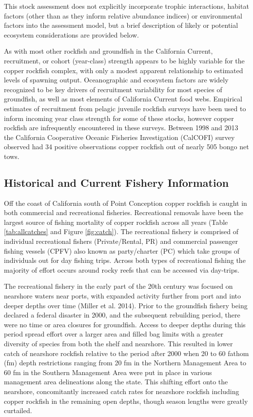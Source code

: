 \documentclass[11pt,
  english,
  letterpaper,
]{article}
\begin{document}
This stock assessment does not explicitly incorporate trophic interactions, habitat factors (other than as they inform relative abundance indices) or environmental factors into the assessment model, but a brief description of likely or potential ecosystem considerations are provided below.

As with most other rockfish and groundfish in the California Current, recruitment, or cohort (year-class) strength appears to be highly variable for the copper rockfish complex, with only a modest apparent relationship to estimated levels of spawning output. Oceanographic and ecosystem factors are widely recognized to be key drivers of recruitment variability for most species of groundfish, as well as most elements of California Current food webs. Empirical estimates of recruitment from pelagic juvenile rockfish surveys have been used to inform incoming year class strength for some of these stocks, however copper rockfish are infrequently encountered in these surveys. Between 1998 and 2013 the California Cooperative Oceanic Fisheries Investigation (CalCOFI) survey observed had 34 positive observations copper rockfish out of nearly 505 bongo net tows.

\hypertarget{historical-and-current-fishery-information}{%
\subsection{Historical and Current Fishery Information}\label{historical-and-current-fishery-information}}

Off the coast of California south of Point Conception copper rockfish is caught in both commercial and recreational fisheries. Recreational removals have been the largest source of fishing mortality of copper rockfish across all years (Table \ref{tab:allcatches} and Figure \ref{fig:catch}). The recreational fishery is comprised of individual recreational fishers (Private/Rental, PR) and commercial passenger fishing vessels (CPFV) also known as party/charter (PC) which take groups of individuals out for day fishing trips. Across both types of recreational fishing the majority of effort occurs around rocky reefs that can be accessed via day-trips.

The recreational fishery in the early part of the 20th century was focused on nearshore waters near ports, with expanded activity further from port and into deeper depths over time (Miller et al. 2014). Prior to the groundfish fishery being declared a federal disaster in 2000, and the subsequent rebuilding period, there were no time or area closures for groundfish. Access to deeper depths during this period spread effort over a larger area and filled bag limits with a greater diversity of species from both the shelf and nearshore. This resulted in lower catch of nearshore rockfish relative to the period after 2000 when 20 to 60 fathom (fm) depth restrictions ranging from 20 fm in the Northern Management Area to 60 fm in the Southern Management Area were put in place in various management area delineations along the state. This shifting effort onto the nearshore, concomitantly increased catch rates for nearshore rockfish including copper rockfish in the remaining open depths, though season lengths were greatly curtailed.
\end{document}

